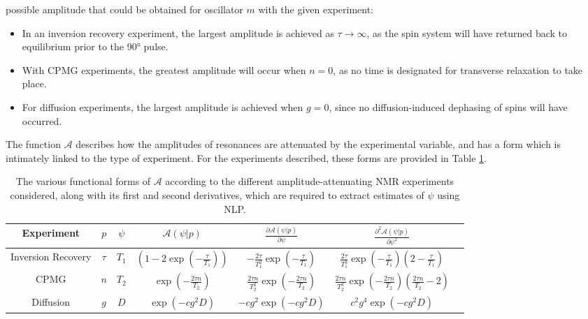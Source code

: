 possible amplitude that could be obtained for oscillator $m$ with the given
experiment:
\begin{itemize}
    \item In an inversion recovery experiment, the largest amplitude is
        achieved as $\tau \rightarrow \infty$, as the spin system will have
        returned back to equilibrium prior to the \ang{90} pulse.
    \item With \ac{CPMG} experiments, the greatest amplitude will occur when
        $n = 0$, as no time is designated for transverse
        relaxation to take place.
    \item For diffusion experiments, the largest amplitude is achieved when
        $g=0$, since no diffusion-induced dephasing of spins will have
        occurred.
\end{itemize}
The function $\mathcal{A}$ describes how the amplitudes of resonances are
attenuated by the experimental variable, and has a form which is intimately
linked to the type of experiment. For the experiments described, these forms
are provided in Table \ref{tab:seq-equations}.
\begin{table}
    \begin{center}
        \begin{tabular}{ccccccc}
            \hline
            Experiment &
            $p$ &
            $\psi$ &
            $\mathcal{A}(\psi | p)$ &
            $\frac{\partial \mathcal{A}(\psi | p)}{\partial \psi}$ &
            $\frac{\partial^2 \mathcal{A}(\psi | p)}{\partial \psi^2}$ \\ \hline
            Inversion Recovery &
            $\tau$ &
            $T_1$ &
            $\left(1 - 2 \exp \left(-\frac{\tau}{T_{1}}\right)\right)$ &
            $-\frac{2 \tau}{T_1^2} \exp\left(-\frac{\tau}{T_1}\right)$ &
            $\frac{2 \tau}{T_1^3} \exp\left(-\frac{\tau}{T_1}\right)\left(2 - \frac{\tau}{T_1}\right)$\\
            \acs{CPMG} &
            $n$ &
            $T_2$ &
            $\exp\left(-\frac{2 \tau n}{T_2}\right)$ &
            $\frac{2 \tau n}{T_2^2}\exp\left(-\frac{2 \tau n}{T_2}\right)$ &
            $\frac{2 \tau n}{T_2^3}\exp\left(-\frac{2 \tau n}{T_2}\right)
            \left( \frac{2 \tau n}{T_2} - 2 \right)$ \\
            Diffusion &
            $g$ &
            $D$ &
            $\exp\left(-c g^2 D\right)$ &
            $-c g^2 \exp\left(-c g^2 D\right)$ &
            $c^2 g^4 \exp\left(-c g^2 D\right)$ \\
            \hline
       \end{tabular}
       \caption[
           The various functional forms of $\mathcal{A}$ according to the
           different amplitude-attenuating NMR experiments considered.
       ]
       {
           The various functional forms of $\mathcal{A}$ according to the
           different amplitude-attenuating NMR experiments considered, along
           with its first and second derivatives, which are required to extract
           estimates of $\psi$ using \ac{NLP}.
       }
       \label{tab:seq-equations}
    \end{center}
\end{table}

